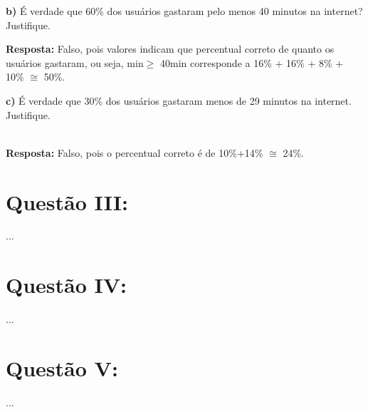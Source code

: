 \documentclass{article}
\begin{document}
\begin{flushleft}

\textbf{b)} É verdade que 60\% dos usuários gastaram pelo menos 40 minutos na internet? Justifique.

\textbf{Resposta:}
Falso, pois valores indicam que percentual correto de quanto os usuários gastaram, ou seja, min$\geq$ 40min corresponde a 16\% + 16\% + 8\% + 10\% $\cong$ 50\%. \\ 

\end{flushleft}
\begin{flushleft}

\textbf{c)} É verdade que 30\% dos usuários gastaram menos de 29 minutos na internet. Justifique.

\\
\textbf{Resposta:}
Falso, pois o percentual correto é de 10\%+14\% $\cong$ 24\%.
\\

\end{flushleft}
\section{Questão III:}
...
\section{Questão IV:}
...
\section{Questão V:}
...
\end{document}
